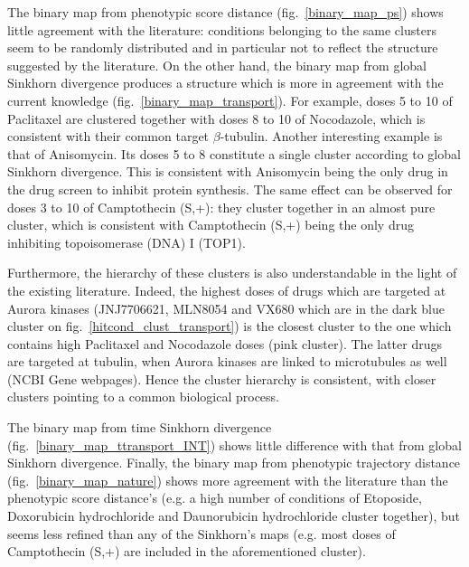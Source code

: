 The binary map from phenotypic score distance
(fig.~\ref{binary_map_ps}) shows little agreement with the literature:
conditions belonging to the same clusters seem to be randomly
distributed and in particular not to reflect the structure suggested
by the literature. 
On the other
hand, the binary map from global Sinkhorn divergence produces a
structure which is more in agreement with the current knowledge
(fig.~\ref{binary_map_transport}). For example, doses 5 to 10 of
Paclitaxel are clustered together with doses 8 to 10 of Nocodazole,
which is consistent with their common target $\beta$-tubulin. 
Another interesting example is that of
Anisomycin. Its doses 5 to 8 constitute a single cluster according to
global Sinkhorn divergence. This is consistent with Anisomycin being
the only drug in the drug screen to inhibit protein synthesis. The
same effect can be observed for doses 3 to 10 of Camptothecin (S,+):
they cluster together in an almost pure cluster, which is consistent
with Camptothecin (S,+) being the only drug inhibiting topoisomerase
(DNA) I (TOP1).  

Furthermore, the hierarchy of these clusters is also understandable in
the light of the existing literature. Indeed, the highest doses of
drugs which are targeted at Aurora kinases (JNJ7706621, MLN8054 and
VX680 which are in the dark blue cluster on
fig.~\ref{hitcond_clust_transport}) is the closest cluster to the one
which contains high Paclitaxel and Nocodazole doses (pink
cluster). The latter drugs are targeted at tubulin, when Aurora
kinases are linked to microtubules as well (NCBI Gene
webpages\cite{pmid24259432}). Hence the cluster hierarchy is
consistent, with closer clusters pointing to a common biological
process.

The binary map from time Sinkhorn divergence (fig.~\ref{binary_map_ttransport_INT}) shows little difference with that from global Sinkhorn divergence. Finally, the binary map from phenotypic trajectory distance (fig.~\ref{binary_map_nature}) shows more agreement with the literature than the phenotypic score distance's (e.g. a high number of conditions of Etoposide, Doxorubicin hydrochloride and Daunorubicin hydrochloride cluster together), but seems less refined than any of the Sinkhorn's maps (e.g. most doses of Camptothecin (S,+) are included in the aforementioned cluster). %

